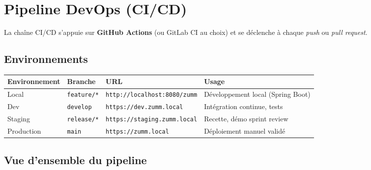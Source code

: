 \chapter{Pipeline DevOps (CI/CD)}
\label{chap:devops}

La chaîne CI/CD s'appuie sur \textbf{GitHub Actions} (ou GitLab CI au choix)
et se déclenche à chaque \emph{push} ou \emph{pull request}.

\section{Environnements}

\begin{center}
\small
\begin{tabular}{llll}
\toprule
\textbf{Environnement} & \textbf{Branche} & \textbf{URL} & \textbf{Usage} \\
\midrule
Local      & \texttt{feature/*}  & \texttt{http://localhost:8080/zumm} & Développement local (Spring Boot) \\
Dev        & \texttt{develop}    & \texttt{https://dev.zumm.local}     & Intégration continue, tests \\
Staging    & \texttt{release/*}  & \texttt{https://staging.zumm.local} & Recette, démo sprint review \\
Production & \texttt{main}       & \texttt{https://zumm.local}         & Déploiement manuel validé \\
\bottomrule
\end{tabular}
\end{center}

\section{Vue d'ensemble du pipeline}

